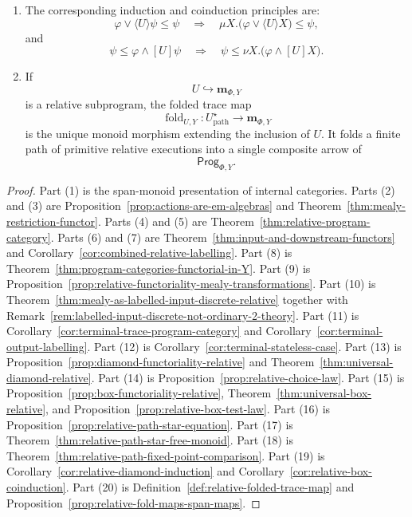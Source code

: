 \begin{theorem}
\begin{enumerate}
\item The corresponding induction and coinduction principles are:
\[
\varphi\vee\langle U\rangle\psi\le\psi
\quad\Longrightarrow\quad
\mu X.\bigl(\varphi\vee\langle U\rangle X\bigr)\le\psi,
\]
and
\[
\psi\le\varphi\wedge[U]\psi
\quad\Longrightarrow\quad
\psi\le\nu X.\bigl(\varphi\wedge[U]X\bigr).
\]

\item If
\[
U\hookrightarrow \mathbf m_{\Phi,Y}
\]
is a relative subprogram, the folded trace map
\[
\operatorname{fold}_{U,Y}:
U^\star_{\mathrm{path}}\to\mathbf m_{\Phi,Y}
\]
is the unique monoid morphism extending the inclusion of \(U\). It folds a
finite path of primitive relative executions into a single composite arrow of
\[
\mathsf{Prog}_{\Phi,Y}.
\]
\end{enumerate}
\end{theorem}

\begin{proof}
Part (1) is the span-monoid presentation of internal categories. Parts (2) and
(3) are Proposition~\ref{prop:actions-are-em-algebras} and
Theorem~\ref{thm:mealy-restriction-functor}. Parts (4) and (5) are
Theorem~\ref{thm:relative-program-category}. Parts (6) and (7) are
Theorem~\ref{thm:input-and-downstream-functors} and
Corollary~\ref{cor:combined-relative-labelling}. Part (8) is
Theorem~\ref{thm:program-categories-functorial-in-Y}. Part (9) is
Proposition~\ref{prop:relative-functoriality-mealy-transformations}. Part
(10) is Theorem~\ref{thm:mealy-as-labelled-input-discrete-relative} together
with Remark~\ref{rem:labelled-input-discrete-not-ordinary-2-theory}. Part
(11) is Corollary~\ref{cor:terminal-trace-program-category} and
Corollary~\ref{cor:terminal-output-labelling}. Part (12) is
Corollary~\ref{cor:terminal-stateless-case}. Part (13) is
Proposition~\ref{prop:diamond-functoriality-relative} and
Theorem~\ref{thm:universal-diamond-relative}. Part (14) is
Proposition~\ref{prop:relative-choice-law}. Part (15) is
Proposition~\ref{prop:box-functoriality-relative},
Theorem~\ref{thm:universal-box-relative}, and
Proposition~\ref{prop:relative-box-test-law}. Part (16) is
Proposition~\ref{prop:relative-path-star-equation}. Part (17) is
Theorem~\ref{thm:relative-path-star-free-monoid}. Part (18) is
Theorem~\ref{thm:relative-path-fixed-point-comparison}. Part (19) is
Corollary~\ref{cor:relative-diamond-induction} and
Corollary~\ref{cor:relative-box-coinduction}. Part (20) is
Definition~\ref{def:relative-folded-trace-map} and
Proposition~\ref{prop:relative-fold-maps-span-maps}.
\end{proof}

